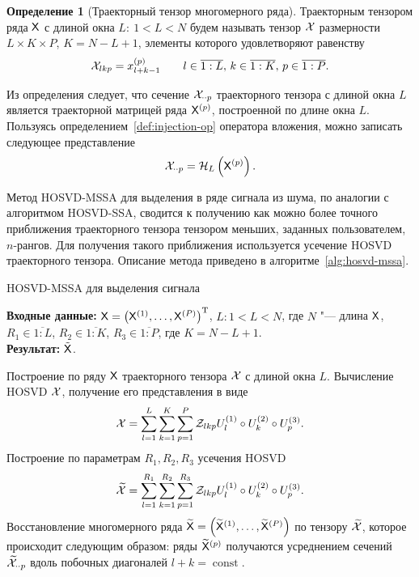 \documentclass[specialist,
    substylefile = spbu.rtx,
    subf,href,colorlinks=true, 12pt]{disser}
\theoremstyle{plain}
\theoremstyle{definition}
\newtheorem{definition}{Определение}[section]
\theoremstyle{remark}
\newcommand{\Input}{\textbf{Входные данные: }}
\newcommand{\Output}{\textbf{Результат: }}
\begin{document}
    \begin{definition}[Траекторный тензор многомерного ряда]
        \label{def:trajectory-tensor-mssa}
        Траекторным тензором ряда $\mathsf{X}$ с длиной окна $L:\: 1< L < N$ будем называть тензор $\mathcal{X}$
        размерности ${L \times K \times P}$, ${K = N - L + 1}$, элементы которого удовлетворяют равенству
        \[
            \mathcal{X}_{lkp}=x_{l+k-1}^{(p)} \qquad l \in \overline{1:L},\, k \in \overline{1:K},\, p \in \overline{1:P}.
        \]
    \end{definition}

    Из определения следует, что сечение $\mathcal{X}_{\cdot \cdot p}$ траекторного тензора с длиной окна $L$
    является траекторной матрицей ряда $\mathsf{X}^{(p)}$, построенной по длине окна $L$.
    Пользуясь определением~\ref{def:injection-op} оператора вложения, можно записать следующее представление
    \[
        \mathcal{X}_{\cdot \cdot p} = \mathcal{H}_L \left(\mathsf{X}^{(p)}\right).
    \]

    Метод HOSVD-MSSA для выделения в ряде сигнала из шума, по аналогии с алгоритмом HOSVD-SSA,
    сводится к получению как можно более точного приближения траекторного тензора тензором меньших,
    заданных пользователем, $n$-рангов.
    Для получения такого приближения используется усечение HOSVD траекторного тензора.
    Описание метода приведено в алгоритме~\ref{alg:hosvd-mssa}.

    \begin{algorithm}[!ht]
        \caption{HOSVD-MSSA для выделения сигнала}
        \label{alg:hosvd-mssa}
        \Input $\mathsf{X} = \left(\mathsf{X}^{(1)}, \ldots, \mathsf{X}^{(P)}\right)^{\mathrm{T}}$,
        $L: 1< L < N$, где $N$ "--- длина $\mathsf{X}$, $R_1 \in \overline{1:L}$,
        $R_2 \in \overline{1:K}$, $R_3 \in \overline{1:P}$, где $K = N-L+1$.\\
        \Output $\tilde{\mathsf{X}}$.
        \begin{algorithmic}[1]
            \State Построение по ряду $\mathsf{X}$ траекторного тензора $\mathcal{X}$ с длиной окна $L$.
            \State Вычисление HOSVD $\mathcal{X}$, получение его представления в виде
            \begin{equation}
                \mathcal{X} = \sum_{l=1}^{L} \sum_{k=1}^{K} \sum_{p=1}^{P} \mathcal{Z}_{lkp} U_l^{(1)}\circ U_k^{(2)} \circ U_p^{(3)}.
                \label{eq:hosvd-mssa}
            \end{equation}
            \State Построение по параметрам $R_1, R_2, R_3$ усечения HOSVD
            \[
                \widetilde{\mathcal{X}}=\sum_{l=1}^{R_1} \sum_{k=1}^{R_2} \sum_{p=1}^{R_3} \mathcal{Z}_{lkp} U_l^{(1)}\circ U_k^{(2)} \circ U_p^{(3)}.
            \]
            \State \label{step:hosvd-mssa-sep-restoration} Восстановление многомерного ряда $\widetilde{\mathsf{X}}=\left(\widetilde{\mathsf{X}}^{(1)}, \ldots, \widetilde{\mathsf{X}}^{(P)}\right)$ по тензору
            $\widetilde{\mathcal{X}}$, которое происходит следующим образом:
            ряды $\widetilde{\mathsf{X}}^{(p)}$ получаются усреднением сечений $\widetilde{\mathcal{X}}_{\cdot \cdot p}$ вдоль
            побочных диагоналей $l+k=\operatorname{const}$.
        \end{algorithmic}
    \end{algorithm}
\end{document}
